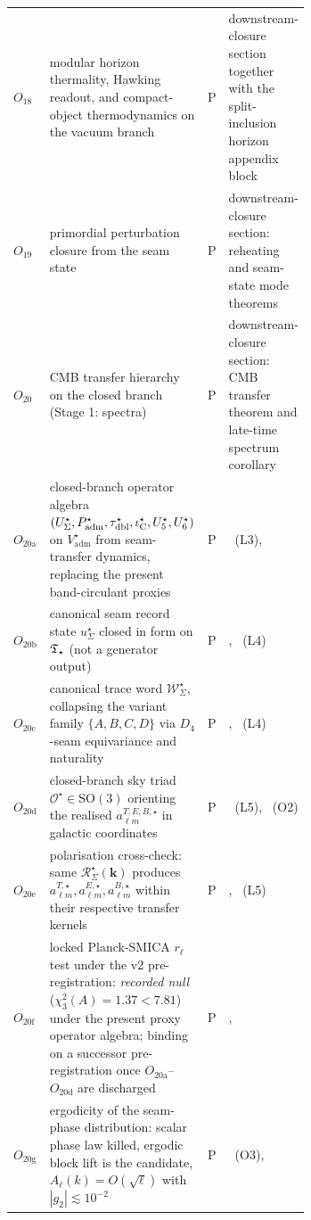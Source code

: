 \begin{table}[p]
\begin{tabularx}{\linewidth}{@{}>{\raggedright\arraybackslash}p{0.10\linewidth}>{\raggedright\arraybackslash}p{0.48\linewidth}>{\centering\arraybackslash}p{0.08\linewidth}Y@{}}
$O_{18}$ & modular horizon thermality, Hawking readout, and compact-object thermodynamics on the vacuum branch & P & downstream-closure section together with the split-inclusion horizon appendix block \\
$O_{19}$ & primordial perturbation closure from the seam state & P & downstream-closure section: reheating and seam-state mode theorems \\
$O_{20}$ & CMB transfer hierarchy on the closed branch (Stage 1: spectra) & P & downstream-closure section: CMB transfer theorem and late-time spectrum corollary \\
$O_{20\mathrm{a}}$ & closed-branch operator algebra $(U_\Sigma^\star,P_{\mathrm{adm}}^\star,\tau_{\mathrm{dbl}}^\star,\iota_{\mathrm C}^\star,U_5^\star,U_6^\star)$ on $V_{\mathrm{adm}}^\star$ from seam-transfer dynamics, replacing the present band-circulant proxies & P & ~(L3),  \\
$O_{20\mathrm{b}}$ & canonical seam record state $u_\Sigma^\star$ closed in form on $\mathfrak T_{\star}$ (not a generator output) & P & , ~(L4) \\
$O_{20\mathrm{c}}$ & canonical trace word $\mathcal W_\Sigma^\star$, collapsing the variant family $\{A,B,C,D\}$ via $D_4$-seam equivariance and naturality & P & , ~(L4) \\
$O_{20\mathrm{d}}$ & closed-branch sky triad $\mathcal O^\star\in\mathrm{SO}(3)$ orienting the realised $a_{\ell m}^{T,E,B,\star}$ in galactic coordinates & P & ~(L5), ~(O2) \\
$O_{20\mathrm{e}}$ & polarisation cross-check: same $\mathcal R_\Sigma^\star(\mathbf k)$ produces $a_{\ell m}^{T,\star},a_{\ell m}^{E,\star},a_{\ell m}^{B,\star}$ within their respective transfer kernels & P & , ~(L5) \\
$O_{20\mathrm{f}}$ & locked Planck-SMICA $r_\ell$ test under the v2 pre-registration: \emph{recorded null} ($\chi_3^2(A)=1.37<7.81$) under the present proxy operator algebra; binding on a successor pre-registration once $O_{20\mathrm{a}}$--$O_{20\mathrm{d}}$ are discharged & P & ,  \\
$O_{20\mathrm{g}}$ & ergodicity of the seam-phase distribution: scalar phase law killed, ergodic block lift is the candidate, $A_\ell(k)=O(\sqrt{\ell})$ with $|g_2|\lesssim 10^{-2}$ & P & ~(O3),  \\

\end{tabularx}
\end{table}
